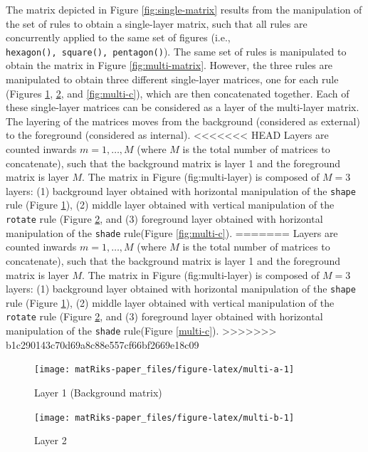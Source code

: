 The matrix depicted in Figure \ref{fig:single-matrix} results from the manipulation of the set of rules to obtain a single-layer matrix, such that all rules are concurrently applied to the same set of figures (i.e., \texttt{hexagon(),\ square(),\ pentagon()}).
The same set of rules is manipulated to obtain the matrix in Figure \ref{fig:multi-matrix}. However, the three rules are manipulated to obtain three different single-layer matrices, one for each rule (Figures \ref{fig:multi-a}, \ref{fig:multi-b}, and \ref{fig:multi-c}), which are then concatenated together.
Each of these single-layer matrices can be considered as a layer of the multi-layer matrix. The layering of the matrices moves from the background (considered as external) to the foreground (considered as internal).
<<<<<<< HEAD
Layers are counted inwards \(m = 1, \ldots, M\) (where \(M\) is the total number of matrices to concatenate), such that the background matrix is layer 1 and the foreground matrix is layer \(M\). The matrix in Figure (fig:multi-layer) is composed of \(M = 3\) layers: (1) background layer obtained with horizontal manipulation of the \texttt{shape} rule (Figure \ref{fig:multi-a}), (2) middle layer obtained with vertical manipulation of the \texttt{rotate} rule (Figure \ref{fig:multi-b}, and (3) foreground layer obtained with horizontal manipulation of the \texttt{shade} rule(Figure \ref{fig:multi-c}).
=======
Layers are counted inwards \(m = 1, \ldots, M\) (where \(M\) is the total number of matrices to concatenate), such that the background matrix is layer 1 and the foreground matrix is layer \(M\). The matrix in Figure (fig:multi-layer) is composed of \(M = 3\) layers: (1) background layer obtained with horizontal manipulation of the \texttt{shape} rule (Figure \ref{fig:multi-a}), (2) middle layer obtained with vertical manipulation of the \texttt{rotate} rule (Figure \ref{fig:multi-b}, and (3) foreground layer obtained with horizontal manipulation of the \texttt{shade} rule(Figure \ref{multi-c}).
>>>>>>> b1c290143c70d69a8c88e557cf66bf2669e18c09

\begin{figure}
\texttt{[image: matRiks-paper\_files/figure-latex/multi-a-1]} \caption{Layer 1 (Background matrix)}\label{fig:multi-a}
\end{figure}

\begin{figure}
\texttt{[image: matRiks-paper\_files/figure-latex/multi-b-1]} \caption{Layer 2}\label{fig:multi-b}
\end{figure}

